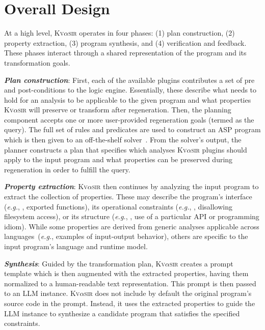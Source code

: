 \documentclass[nonacm,sigplan,review]{acmart}
\def\eg{{\em e.g.}, }
\newcommand{\sys}{{\scshape Kv{$\alpha$}sir}\xspace}
\newcommand{\heading}[1]{\vspace{2pt}\noindent\textbf{\emph{#1}}:\enspace}
\begin{document}
\section{Overall Design}
\label{sec:design}

At a high level, \sys operates in four phases: (1) plan construction, (2)
property extraction, (3) program synthesis, and (4) verification and feedback.
These phases interact through a shared representation of the program and its
transformation goals.

\heading{Plan construction}
First, each of the available plugins contributes a set of pre and post-conditions 
to the logic engine.
Essentially, these describe what needs to hold for an analysis to be applicable to the given 
program and what properties \sys will preserve or transform after regeneration.
Then, the planning component accepts one or more user-provided regeneration goals (termed as the query).
The full set of rules and predicates are used to construct an ASP program
which is then given to an off-the-shelf solver~\cite{gebser2007clasp}.
From the solver's output, the planner constructs a plan that specifies which
analyses \sys plugins should apply to the input program and what properties can be
preserved during regeneration in order to fulfill the query.

\heading{Property extraction} \sys then continues by analyzing the input program to
extract the collection of properties.
These may describe the program's interface
(\eg, exported functions), its operational constraints (\eg, disallowing
filesystem access), or its structure (\eg, use of a particular API or programming idiom).
While some properties are derived from generic analyses
applicable across languages~(\eg examples of input-output behavior), others are specific to the input program's language and runtime model.

\heading{Synthesis}
Guided by the transformation plan, \sys creates a prompt template which is then
augmented with the extracted properties, having them normalized to a human-readable text representation.
This prompt is then passed to an LLM instance.
\sys does not include by default the original program's source code in the prompt.
Instead, it uses the extracted properties to guide the LLM instance 
to synthesize a candidate program that satisfies the specified constraints.
\end{document}
